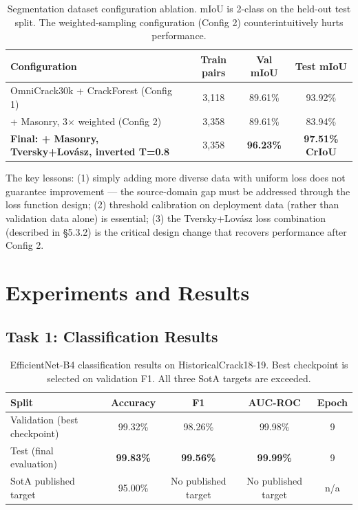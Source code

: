 \documentclass[12pt,a4paper]{article}
\begin{document}
\begin{table}[H]
\centering
\caption{Segmentation dataset configuration ablation. mIoU is 2-class on the held-out test split. The weighted-sampling configuration (Config 2) counterintuitively hurts performance.}
\label{tab:seg_ablation}
\begin{tabular}{p{5.8cm}ccc}
\toprule
\rowcolor{white}
\textbf{Configuration} & \textbf{Train pairs} & \textbf{Val mIoU} & \textbf{Test mIoU} \\
\midrule
OmniCrack30k + CrackForest (Config 1) & 3,118 & 89.61\% & 93.92\% \\
+ Masonry, 3$\times$ weighted (Config 2) & 3,358 & 89.61\% & 83.94\% \\
\textbf{Final: + Masonry, Tversky+Lov\'{a}sz, inverted T=0.8} & 3,358 & \textbf{96.23\%} & \textbf{97.51\% CrIoU} \\
\bottomrule
\end{tabular}
\end{table}

The key lessons: (1) simply adding more diverse data with uniform loss does not guarantee improvement --- the source-domain gap must be addressed through the loss function design; (2) threshold calibration on deployment data (rather than validation data alone) is essential; (3) the Tversky+Lov\'{a}sz loss combination (described in \S5.3.2) is the critical design change that recovers performance after Config 2.

\clearpage
\section{Experiments and Results}

\subsection{Task 1: Classification Results}

\begin{table}[H]
\centering
\caption{EfficientNet-B4 classification results on HistoricalCrack18-19. Best checkpoint is selected on validation F1. All three SotA targets are exceeded.}
\label{tab:cls_results}
\begin{tabular}{lcccc}
\toprule
\rowcolor{white}
\textbf{Split} & \textbf{Accuracy} & \textbf{F1} & \textbf{AUC-ROC} & \textbf{Epoch} \\
\midrule
Validation (best checkpoint) & 99.32\% & 98.26\% & 99.98\% & 9 \\
Test (final evaluation) & \textbf{99.83\%} & \textbf{99.56\%} & \textbf{99.99\%} & 9 \\
SotA published target & 95.00\% & No published target & No published target & n/a \\
\bottomrule
\end{tabular}
\end{table}
\end{document}
